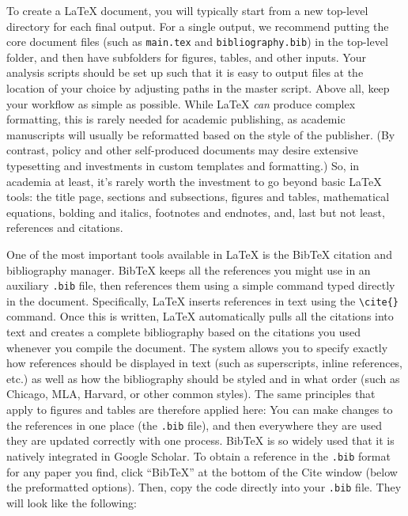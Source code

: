 To create a {\LaTeX} document,
you will typically start from a new top-level directory for each final output.
For a single output, we recommend putting the core document files
(such as \texttt{main.tex} and \texttt{bibliography.bib})
in the top-level folder,
and then have subfolders for figures, tables, and other inputs.
Your analysis scripts should be set up such that it is easy to output files
at the location of your choice by adjusting paths in the master script.
Above all, keep your workflow as simple as possible.
While {\LaTeX} \textit{can} produce complex formatting,
this is rarely needed for academic publishing,
as academic manuscripts will usually be reformatted
based on the style of the publisher.
(By contrast, policy and other self-produced documents may desire
extensive typesetting and investments in custom templates and formatting.)
So, in academia at least,
it's rarely worth the investment to go beyond basic {\LaTeX} tools:
the title page, sections and subsections,
figures and tables, mathematical equations,
bolding and italics, footnotes and endnotes,
and, last but not least, references and citations.

One of the most important tools available in {\LaTeX}
is the BibTeX citation and bibliography manager.\cite{kopka1995guide}
BibTeX keeps all the references you might use in an auxiliary \texttt{.bib} file,
then references them using a simple command typed directly in the document.
Specifically, {\LaTeX} inserts references in text using the \texttt{\textbackslash cite\{\}} command.
Once this is written, {\LaTeX} automatically pulls all the citations into text
and creates a complete bibliography based on the citations you used whenever you compile the document.
The system allows you to specify exactly how references should be displayed in text
(such as superscripts, inline references, etc.)
as well as how the bibliography should be styled and in what order
(such as Chicago, MLA, Harvard, or other common styles).
The same principles that apply to figures and tables are therefore applied here:
You can make changes to the references in one place (the \texttt{.bib} file),
and then everywhere they are used they are updated correctly with one process.
BibTeX is so widely used that it is natively integrated in Google Scholar.
To obtain a reference in the \texttt{.bib} format for any paper you find,
click ``BibTeX'' at the bottom of the Cite window (below the preformatted options).
Then, copy the code directly into your \texttt{.bib} file.
They will look like the following:

